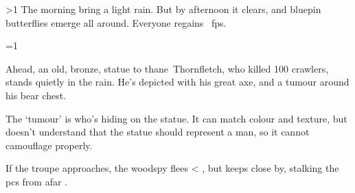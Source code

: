 \ifnum\value{temperature}>1
The morning bring a light rain.
But by afternoon it clears, and bluepin butterflies emerge all around.
Everyone regains ~\glspl{fp}.

\fi

\ifnum\value{cycle}=1%
  \begin{boxtext}
    Ahead, an old, bronze, statue to \gls{thane}~Thornfletch, who killed 100 \glspl{crawler}, stands quietly in the rain.
    He's depicted with his great axe, and a tumour around his bear chest.
  \end{boxtext}

  The `tumour' is  who's hiding on the statue.
  It can match colour and texture, but doesn't understand that the statue should represent a man, so it cannot camouflage properly.

  If the troupe approaches,
  the \gls{woodspy} flees%
  \ifnum\value{r12}<\value{hp}%
    , but keeps close by, stalking the \glspl{pc} from afar%
  \fi.%

  \woodspy

\fi
